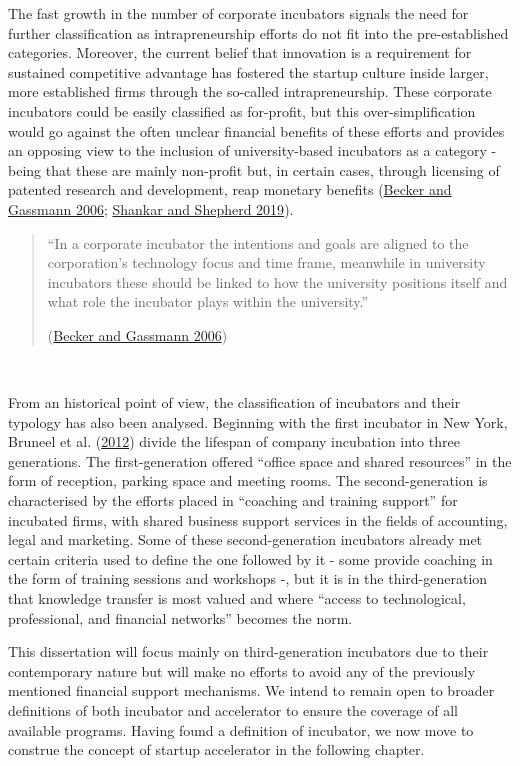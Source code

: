 \documentclass[
  12pt,
]{article}
\begin{document}
The fast growth in the number of corporate incubators signals the need for further classification as intrapreneurship efforts do not fit into the pre-established categories. Moreover, the current belief that innovation is a requirement for sustained competitive advantage has fostered the startup culture inside larger, more established firms through the so-called intrapreneurship. These corporate incubators could be easily classified as for-profit, but this over-simplification would go against the often unclear financial benefits of these efforts and provides an opposing view to the inclusion of university-based incubators as a category - being that these are mainly non-profit but, in certain cases, through licensing of patented research and development, reap monetary benefits (\protect\hyperlink{ref-becker_corporate_2006}{Becker and Gassmann 2006}; \protect\hyperlink{ref-shankar_accelerating_2019}{Shankar and Shepherd 2019}).

\begin{quote}
``In a corporate incubator the intentions and goals are aligned to the corporation's technology focus and time frame, meanwhile in university incubators these should be linked to how the university positions itself and what role the incubator plays within the university.''

(\protect\hyperlink{ref-becker_corporate_2006}{Becker and Gassmann 2006})
\end{quote}

~

From an historical point of view, the classification of incubators and their typology has also been analysed. Beginning with the first incubator in New York, Bruneel et al. (\protect\hyperlink{ref-bruneel_evolution_2012}{2012}) divide the lifespan of company incubation into three generations. The first-generation offered ``office space and shared resources'' in the form of reception, parking space and meeting rooms. The second-generation is characterised by the efforts placed in ``coaching and training support'' for incubated firms, with shared business support services in the fields of accounting, legal and marketing. Some of these second-generation incubators already met certain criteria used to define the one followed by it - some provide coaching in the form of training sessions and workshops -, but it is in the third-generation that knowledge transfer is most valued and where ``access to technological, professional, and financial networks'' becomes the norm.

This dissertation will focus mainly on third-generation incubators due to their contemporary nature but will make no efforts to avoid any of the previously mentioned financial support mechanisms. We intend to remain open to broader definitions of both incubator and accelerator to ensure the coverage of all available programs. Having found a definition of incubator, we now move to construe the concept of startup accelerator in the following chapter.
\end{document}
